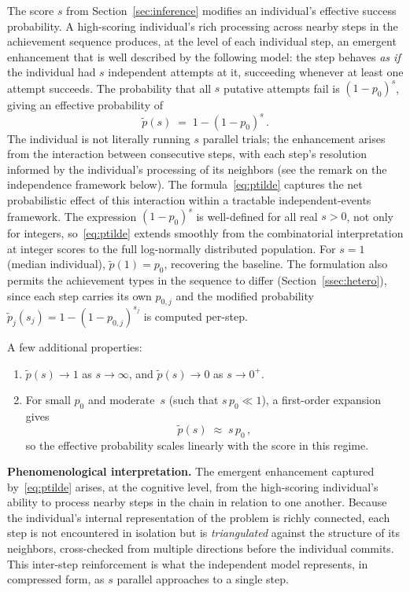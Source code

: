 \documentclass{article}
\begin{document}
The score $s$ from Section~\ref{sec:inference} modifies an individual's
effective success probability. A high-scoring individual's rich
processing across nearby steps in the achievement sequence produces, at
the level of each individual step, an emergent enhancement that is
well described by the following model: the step behaves \emph{as if}
the individual had $s$ independent attempts at it, succeeding whenever
at least one attempt succeeds. The probability that all $s$ putative
attempts fail is $(1-p_0)^s$, giving an effective probability of
\begin{equation}\label{eq:ptilde}
  \widetilde{p}(s)
  \;=\;
  1 - (1 - p_0)^{s}\,.
\end{equation}
The individual is not literally running $s$ parallel trials; the
enhancement arises from the interaction between consecutive steps, with
each step's resolution informed by the individual's processing of its
neighbors (see the remark on the independence framework below).
The formula~\eqref{eq:ptilde} captures the net probabilistic effect of
this interaction within a tractable independent-events framework.
The expression $(1-p_0)^s$ is well-defined for all real $s > 0$, not
only for integers, so~\eqref{eq:ptilde} extends smoothly from the
combinatorial interpretation at integer scores to the full
log-normally distributed population. For $s = 1$ (median individual),
$\widetilde{p}(1) = p_0$, recovering the baseline. The formulation
also permits the achievement types in the sequence to differ
(Section~\ref{ssec:hetero}), since each step carries its own
$p_{0,j}$ and the modified probability
$\widetilde{p}_j(s_j) = 1 - (1-p_{0,j})^{s_j}$ is computed per-step.

A few additional properties:
\begin{enumerate}
  \item[\textbf{(i)}]
    $\widetilde{p}(s) \to 1$ as $s \to \infty$, and
    $\widetilde{p}(s) \to 0$ as $s \to 0^+$.
  \item[\textbf{(ii)}]
    For small $p_0$ and moderate~$s$ (such that $s\,p_0 \ll 1$), a
    first-order expansion gives
    \begin{equation}\label{eq:ptilde-approx}
      \widetilde{p}(s) \;\approx\; s\,p_0\,,
    \end{equation}
    so the effective probability scales linearly with the score in this
    regime.
\end{enumerate}

\noindent\textbf{Phenomenological interpretation.}\;
The emergent enhancement captured by~\eqref{eq:ptilde} arises, at the
cognitive level, from the high-scoring individual's ability to process
nearby steps in the chain in relation to one another. Because the
individual's internal representation of the problem is richly connected,
each step is not encountered in isolation but is \emph{triangulated}
against the structure of its neighbors, cross-checked from multiple
directions before the individual commits. This inter-step reinforcement
is what the independent model represents, in compressed form, as $s$
parallel approaches to a single step.
\end{document}
